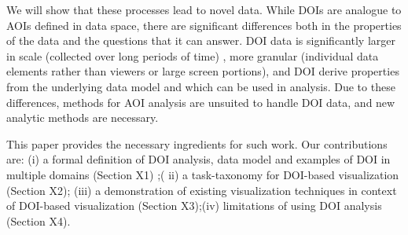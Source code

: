 We will show that these processes lead to novel data. While DOIs are analogue to AOIs defined in data space, there are significant differences both in the properties of the data and the questions that it can answer. DOI data is significantly larger in scale (collected over long periods of time) , more granular (individual data elements rather than viewers or large screen portions), and DOI derive properties from the underlying data model and which can be used in analysis. Due to these differences, methods for AOI analysis are unsuited to handle DOI data, and new analytic methods are necessary.  

This paper provides the necessary ingredients for such work. Our contributions are: (i) a formal definition of DOI analysis, data model and examples of DOI in multiple domains (Section X1) ;( ii) a task-taxonomy for DOI-based visualization (Section X2); (iii) a demonstration of existing visualization techniques in context of DOI-based visualization (Section X3);(iv) limitations of using DOI analysis (Section X4). 

